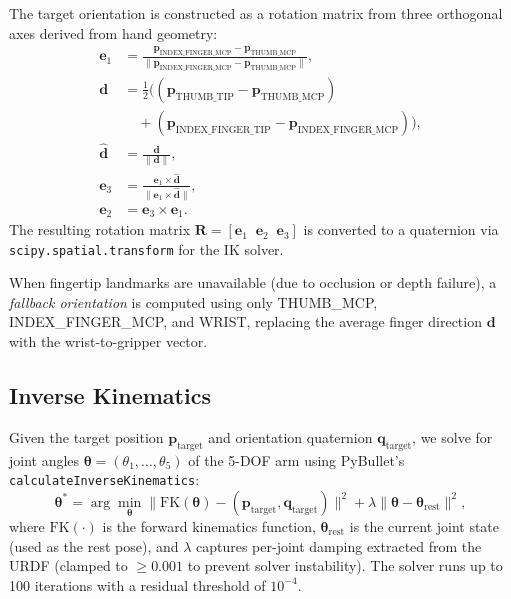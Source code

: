 \documentclass[10pt,journal]{IEEEtran}
\newcommand{\vect}[1]{\mathbf{#1}}
\newcommand{\mat}[1]{\mathbf{#1}}
\begin{document}
The target orientation is constructed as a rotation matrix from three
orthogonal axes derived from hand geometry:
\begin{align}
  \vect{e}_1 &= \frac{\vect{p}_{\text{INDEX\_FINGER\_MCP}} -
    \vect{p}_{\text{THUMB\_MCP}}}
    {\|\vect{p}_{\text{INDEX\_FINGER\_MCP}} -
    \vect{p}_{\text{THUMB\_MCP}}\|},
    \label{eq:e1} \\
  \vect{d} &= \frac{1}{2}\bigl(
    (\vect{p}_{\text{THUMB\_TIP}} - \vect{p}_{\text{THUMB\_MCP}}) \nonumber \\
    &\quad + (\vect{p}_{\text{INDEX\_FINGER\_TIP}} -
    \vect{p}_{\text{INDEX\_FINGER\_MCP}})
  \bigr), \label{eq:avgdir} \\
  \hat{\vect{d}} &= \frac{\vect{d}}{\|\vect{d}\|}, \nonumber \\
  \vect{e}_3 &= \frac{\vect{e}_1 \times \hat{\vect{d}}}
    {\|\vect{e}_1 \times \hat{\vect{d}}\|}, \label{eq:e3} \\
  \vect{e}_2 &= \vect{e}_3 \times \vect{e}_1. \label{eq:e2}
\end{align}
The resulting rotation matrix $\mat{R} = [\vect{e}_1 \;\; \vect{e}_2
\;\; \vect{e}_3]$ is converted to a quaternion via
\texttt{scipy.spatial.transform} for the IK solver.

When fingertip landmarks are unavailable (due to occlusion or depth
failure), a \emph{fallback orientation} is computed using only
THUMB\_MCP, INDEX\_FINGER\_MCP, and WRIST, replacing the average finger
direction $\vect{d}$ with the wrist-to-gripper vector.

\subsection{Inverse Kinematics}
\label{sec:ik}

Given the target position $\vect{p}_{\text{target}}$ and orientation
quaternion $\vect{q}_{\text{target}}$, we solve for joint angles
$\vect{\theta} = (\theta_1, \ldots, \theta_5)$ of the 5-DOF arm using
PyBullet's \texttt{calculateInverseKinematics}:
\begin{equation}\label{eq:ik}
  \vect{\theta}^* = \arg\min_{\vect{\theta}}
  \bigl\|
    \text{FK}(\vect{\theta}) - (\vect{p}_{\text{target}},
                                  \vect{q}_{\text{target}})
  \bigr\|^2
  + \lambda \|\vect{\theta} - \vect{\theta}_{\text{rest}}\|^2,
\end{equation}
where $\text{FK}(\cdot)$ is the forward kinematics function,
$\vect{\theta}_{\text{rest}}$ is the current joint state (used as the
rest pose), and $\lambda$ captures per-joint damping extracted from the
URDF (clamped to $\geq 0.001$ to prevent solver instability). The solver
runs up to 100 iterations with a residual threshold of $10^{-4}$.
\end{document}
